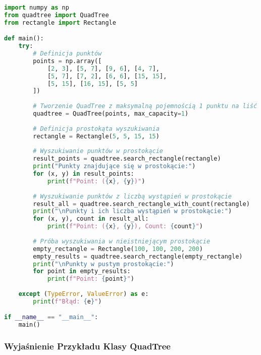\documentclass[12pt]{article}
\begin{document}
\begin{lstlisting}[language=Python, caption=Przykład użycia klasy QuadTree, style=examplestyle]
import numpy as np
from quadtree import QuadTree
from rectangle import Rectangle

def main():
    try:
        # Definicja punktów
        points = np.array([
            [2, 3], [5, 7], [9, 6], [4, 7],
            [5, 7], [7, 2], [6, 6], [15, 15],
            [5, 15], [16, 15], [5, 5]
        ])
        
        # Tworzenie QuadTree z maksymalną pojemnością 1 punktu na liść
        quadtree = QuadTree(points, max_capacity=1)
        
        # Definicja prostokąta wyszukiwania
        rectangle = Rectangle(5, 5, 15, 15)
        
        # Wyszukiwanie punktów w prostokącie
        result_points = quadtree.search_rectangle(rectangle)
        print("Punkty znajdujące się w prostokącie:")
        for (x, y) in result_points:
            print(f"Point: ({x}, {y})")
        
        # Wyszukiwanie punktów z liczbą wystąpień w prostokącie
        result_all = quadtree.search_rectangle_with_count(rectangle)
        print("\nPunkty i ich liczba wystąpień w prostokącie:")
        for (x, y), count in result_all:
            print(f"Point: ({x}, {y}), Count: {count}")
        
        # Próba wyszukiwania w nieistniejącym prostokącie
        empty_rectangle = Rectangle(100, 100, 200, 200)
        empty_results = quadtree.search_rectangle(empty_rectangle)
        print("\nPunkty w pustym prostokącie:")
        for point in empty_results:
            print(f"Point: {point}")
        
    except (TypeError, ValueError) as e:
        print(f"Błąd: {e}")

if __name__ == "__main__":
    main()
\end{lstlisting}

\subsubsection{Wyjaśnienie Przykładu Klasy QuadTree}
\end{document}
